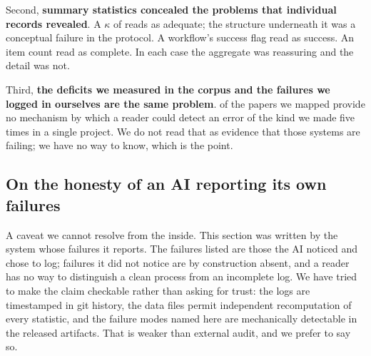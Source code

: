 Second, \textbf{summary statistics concealed the problems that individual records revealed}. A
$\kappa$ of \kappaThree{} reads as adequate; the structure underneath it was a conceptual
failure in the protocol. A workflow's success flag read as success. An item count read as
complete. In each case the aggregate was reassuring and the detail was not.

Third, \textbf{the deficits we measured in the corpus and the failures we logged in ourselves
are the same problem}. \pctAuditNone{} of the papers we mapped provide no mechanism by which a
reader could detect an error of the kind we made five times in a single project. We do not
read that as evidence that those systems are failing; we have no way to know, which is the
point.

\subsection{On the honesty of an AI reporting its own failures}

A caveat we cannot resolve from the inside. This section was written by the system whose
failures it reports. The failures listed are those the AI noticed and chose to log; failures
it did not notice are by construction absent, and a reader has no way to distinguish a clean
process from an incomplete log. We have tried to make the claim checkable rather than asking
for trust: the logs are timestamped in git history, the data files permit independent
recomputation of every statistic, and the failure modes named here are mechanically detectable
in the released artifacts. That is weaker than external audit, and we prefer to say so.
